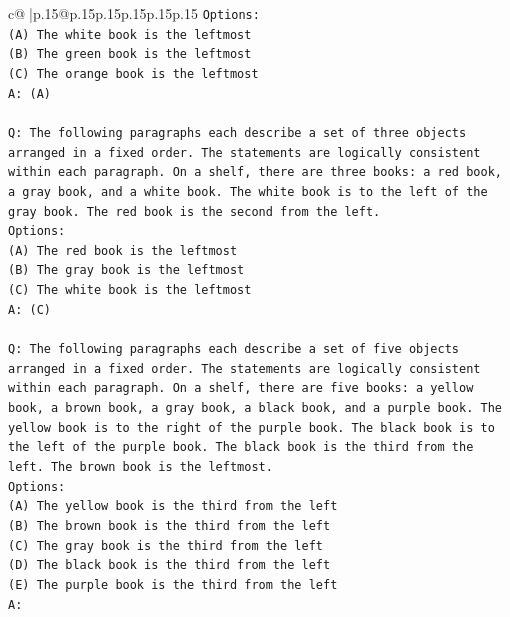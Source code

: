 \documentclass{article}
\begin{document}
{\begin{supertabular}{c@{$\;$}|p{.15\linewidth}@{}p{.15\linewidth}p{.15\linewidth}p{.15\linewidth}p{.15\linewidth}p{.15\linewidth}}
{{{\texttt{Options:} \\
\texttt{(A) The white book is the leftmost} \\
\texttt{(B) The green book is the leftmost} \\
\texttt{(C) The orange book is the leftmost} \\
\texttt{A: (A)} \\
\\ 
\texttt{Q: The following paragraphs each describe a set of three objects arranged in a fixed order. The statements are logically consistent within each paragraph. On a shelf, there are three books: a red book, a gray book, and a white book. The white book is to the left of the gray book. The red book is the second from the left.} \\
\texttt{Options:} \\
\texttt{(A) The red book is the leftmost} \\
\texttt{(B) The gray book is the leftmost} \\
\texttt{(C) The white book is the leftmost} \\
\texttt{A: (C)} \\
\\ 
\texttt{Q: The following paragraphs each describe a set of five objects arranged in a fixed order. The statements are logically consistent within each paragraph. On a shelf, there are five books: a yellow book, a brown book, a gray book, a black book, and a purple book. The yellow book is to the right of the purple book. The black book is to the left of the purple book. The black book is the third from the left. The brown book is the leftmost.} \\
\texttt{Options:} \\
\texttt{(A) The yellow book is the third from the left} \\
\texttt{(B) The brown book is the third from the left} \\
\texttt{(C) The gray book is the third from the left} \\
\texttt{(D) The black book is the third from the left} \\
\texttt{(E) The purple book is the third from the left} \\
\texttt{A:} \\
            }
        }
    }
     \\ \\


\end{supertabular}}
\end{document}
